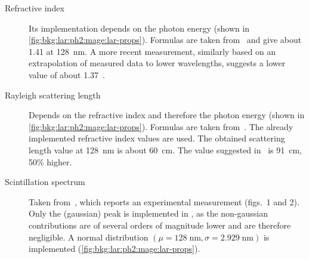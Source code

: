 \begin{description}

  \item[Refractive index] Its implementation depends on the photon energy (shown in
    \cref{fig:bkg:lar:ph2:mage:lar-props}). Formulas are taken from~\cite{Bideau-Mehu1981}
    and give about 1.41 at 128~nm. A more recent measurement, similarly based on an
    extrapolation of measured data to lower wavelengths, suggests a lower value of about
    1.37~\cite{Babicz2018}.

  \item[Rayleigh scattering length] \sloppy Depends on the refractive index and therefore the
    photon energy (shown in \cref{fig:bkg:lar:ph2:mage:lar-props}). Formulas are taken
    from~\cite{Seidel2002}. The already implemented refractive index values are used. The
    obtained scattering length value at 128~nm is about 60~cm. The value suggested
    in~\cite{Babicz2018} is 91~cm, 50\% higher.

  \item[Scintillation spectrum] Taken from~\cite{Heindl2010}, which reports an
    experimental measurement (figs.~1 and 2). Only the (gaussian) peak is implemented in
    \mage, as the non-gaussian contributions are of several orders of magnitude lower and
    are therefore negligible. A normal distribution $(\mu=128\;\text{nm},
    \sigma=2.929\;\text{nm})$ is implemented (\cref{fig:bkg:lar:ph2:mage:lar-props}).


\end{description}
